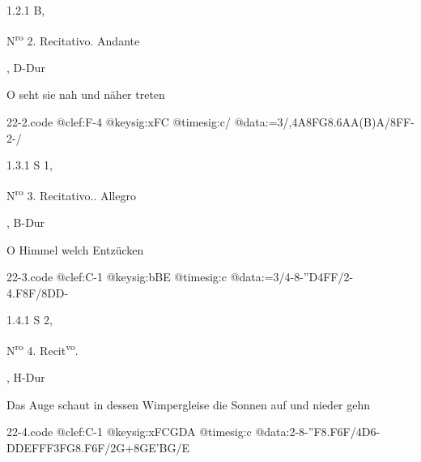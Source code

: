 \documentclass[a4paper, twocolumn, 11pt]{book}
\begin{document}
\newline %
\par 1.2.1  B, \begin{itshape}N\textsuperscript{r}\textsuperscript{o} 2. Recitativo. Andante\end{itshape}, D-Dur\newline \begin{footnotesize} O seht sie nah und näher treten \end{footnotesize}  
\begin{filecontents*}{22-2.code}
@clef:F-4
@keysig:xFC
@timesig:c/
@data:=3/,4A8FG8.6AA(B)A/8FF-2-/
\end{filecontents*}

\newline %
\par 1.3.1  S 1, \begin{itshape}N\textsuperscript{r}\textsuperscript{o} 3. Recitativo.. Allegro\end{itshape}, B-Dur\newline \begin{footnotesize} O Himmel welch Entzücken \end{footnotesize}  
\begin{filecontents*}{22-3.code}
@clef:C-1
@keysig:bBE
@timesig:c
@data:=3/4-8-''D4FF/2-4.F8F/8DD-
\end{filecontents*}

\newline %
\par 1.4.1  S 2, \begin{itshape}N\textsuperscript{r}\textsuperscript{o} 4. Recit\textsuperscript{v}\textsuperscript{o}.\end{itshape}, H-Dur\newline \begin{footnotesize} Das Auge schaut in dessen Wimpergleise die Sonnen auf und nieder gehn \end{footnotesize}  
\begin{filecontents*}{22-4.code}
@clef:C-1
@keysig:xFCGDA
@timesig:c
@data:2-8-''F8.F6F/4D6-DDEFFF3FG8.F6F/2G+8GE'BG/E
\end{filecontents*}
\end{document}
